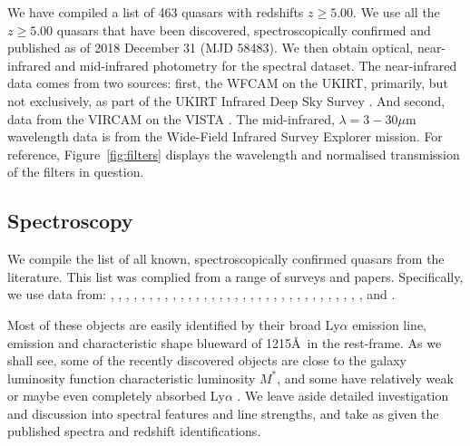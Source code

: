 \documentclass[usenatbib]{mnras}
\begin{document}
We have compiled a list of 463 quasars with redshifts $z\geq5.00$. We
use all the $z\geq5.00$ quasars that have been discovered,
spectroscopically confirmed and published as of 2018 December 31 (MJD
58483). We then obtain optical, near-infrared and mid-infrared
photometry for the spectral dataset. The near-infrared data comes from
two sources: first, the WFCAM \citep[][]{Casali2007} on the UKIRT,
primarily, but not exclusively, as part of the UKIRT Infrared Deep Sky
Survey \citep[UKIDSS; ][]{Lawrence2007}.  And second, data from the
VIRCAM on the VISTA \citep[][]{Emerson2006, Dalton2006}. The
mid-infrared, $\lambda=3-30\mu$m wavelength data is from the 
Wide-Field Infrared Survey Explorer \citep[WISE;][]{Wright2010,
Cutri2013} mission. For reference, Figure~\ref{fig:filters} displays
the wavelength and normalised transmission of the filters in question.

\subsection{Spectroscopy} 
We compile the list of all known, spectroscopically confirmed
quasars from the literature.  This list was complied from a range of
surveys and papers.  Specifically, we use data from:
\citet{Banados2014, Banados2016, Banados2018a, Banados2018b}, 
\citet{Becker2015}, 
\citet{Calura2014}, 
\citet{Carilli2007, Carilli2010}, 
\citet{Carnall2015}, 
\citet{Cool2006}, 
\citet{Douglas2007}, 
\citet{DeRosa2011}, 
\citet{Fan2000, Fan2001c, Fan2003, Fan2004, Fan2006, Fan2018}, 
\citet{Goto2006}, 
\citet{Ikeda2017}, 
\citet{Jiang2008, Jiang2009, Jiang2015, Jiang2016},   
\citet{Kashikawa2015}, 
\citet{Khorunzhev2017}, 
\citet{Koptelova2017}, 
\citet{Kozlowski2019}, 
\citet{Kim2015, Kim2018},  
\citet{Kurk2007, Kurk2009}, 
\citet{Leipski2014}, 
\citet{Mahabal2005}, 
\citet{Matsuoka2016,  Matsuoka2018a, Matsuoka2018b},   
\citet{Mazzucchelli2017}, 
\citet{Morganson2012}, 
\citet{Mortlock2009, Mortlock2011},
\citet{McGreer2006, McGreer2013},  
\citet{Reed2015, Reed2017}, 
\citet{Saxena2018}, 
\citet{Stern2007},  
\citet{Tang2017}, 
\citet{vanBreugel1999}, 
\citet{Venemans2007, Venemans2012, Venemans2013, Venemans2015a, Venemans2015b, Venemans2016},
\citet{WangF2016, WangF2017, WangF2018a, WangF2018b},
\citet{Willott2007, Willott2009, Willott2010a, Willott2013b, Willott2015}, 
\citet{Wu2015} 
\citet{YangJ2018a, YangJ2018b}  
and 
\citet{Zeimann2011}. 

Most of these objects are easily identified by their broad Ly$\alpha$
emission line, \nv emission and characteristic shape blueward of
1215\AA\ in the rest-frame. As we shall see, some of the recently
discovered objects are close to the galaxy luminosity function
characteristic luminosity $M^{*}$, and some have relatively weak or
maybe even completely absorbed Ly$\alpha$ \citep[e.g. Figures 7 and 10
in][]{Banados2016}. We leave aside detailed investigation and
discussion into spectral features and line strengths, and take as
given the published spectra and redshift identifications.
\end{document}
